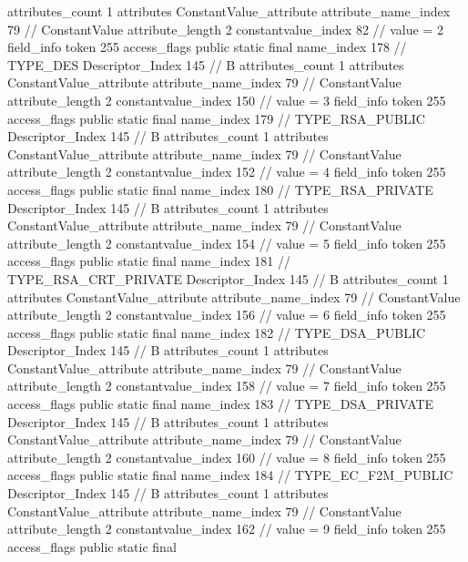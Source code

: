 {{{{{				attributes_count	1
				attributes {
				ConstantValue_attribute {
					attribute_name_index	79		// ConstantValue
					attribute_length	2
					constantvalue_index	82		// value = 2
				}
				}
			}
			field_info {
				token	255
				access_flags	public static final
				name_index	178		// TYPE_DES
				Descriptor_Index	145		// B
				attributes_count	1
				attributes {
				ConstantValue_attribute {
					attribute_name_index	79		// ConstantValue
					attribute_length	2
					constantvalue_index	150		// value = 3
				}
				}
			}
			field_info {
				token	255
				access_flags	public static final
				name_index	179		// TYPE_RSA_PUBLIC
				Descriptor_Index	145		// B
				attributes_count	1
				attributes {
				ConstantValue_attribute {
					attribute_name_index	79		// ConstantValue
					attribute_length	2
					constantvalue_index	152		// value = 4
				}
				}
			}
			field_info {
				token	255
				access_flags	public static final
				name_index	180		// TYPE_RSA_PRIVATE
				Descriptor_Index	145		// B
				attributes_count	1
				attributes {
				ConstantValue_attribute {
					attribute_name_index	79		// ConstantValue
					attribute_length	2
					constantvalue_index	154		// value = 5
				}
				}
			}
			field_info {
				token	255
				access_flags	public static final
				name_index	181		// TYPE_RSA_CRT_PRIVATE
				Descriptor_Index	145		// B
				attributes_count	1
				attributes {
				ConstantValue_attribute {
					attribute_name_index	79		// ConstantValue
					attribute_length	2
					constantvalue_index	156		// value = 6
				}
				}
			}
			field_info {
				token	255
				access_flags	public static final
				name_index	182		// TYPE_DSA_PUBLIC
				Descriptor_Index	145		// B
				attributes_count	1
				attributes {
				ConstantValue_attribute {
					attribute_name_index	79		// ConstantValue
					attribute_length	2
					constantvalue_index	158		// value = 7
				}
				}
			}
			field_info {
				token	255
				access_flags	public static final
				name_index	183		// TYPE_DSA_PRIVATE
				Descriptor_Index	145		// B
				attributes_count	1
				attributes {
				ConstantValue_attribute {
					attribute_name_index	79		// ConstantValue
					attribute_length	2
					constantvalue_index	160		// value = 8
				}
				}
			}
			field_info {
				token	255
				access_flags	public static final
				name_index	184		// TYPE_EC_F2M_PUBLIC
				Descriptor_Index	145		// B
				attributes_count	1
				attributes {
				ConstantValue_attribute {
					attribute_name_index	79		// ConstantValue
					attribute_length	2
					constantvalue_index	162		// value = 9
				}
				}
			}
			field_info {
				token	255
				access_flags	public static final
}}}}}
